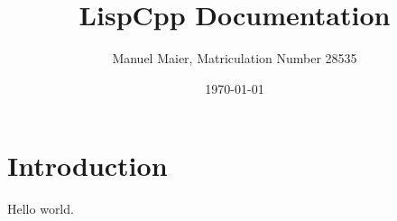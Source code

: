 \documentclass[a4paper]{report}
\title{LispCpp Documentation}
\author{Manuel Maier, Matriculation Number 28535}
\date{\today}
\begin{document}
\maketitle


\section{Introduction}
Hello world.
\end{document}
